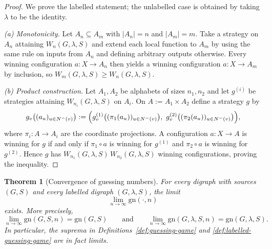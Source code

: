 \documentclass[11pt]{article}
\theoremstyle{plain}
\newtheorem{theorem}{Theorem}[section]
\theoremstyle{definition}
\theoremstyle{definition}
\theoremstyle{remark}
\newcommand{\A}{A}
\newcommand{\abs}[1]{\left\lvert #1 \right\rvert}
\newcommand{\gn}{\mathrm{gn}}
\begin{document}
\begin{proof}
We prove the labelled statement; the unlabelled case is obtained by taking $\lambda$ to be the identity.

\smallskip
\noindent\emph{(a) Monotonicity.}
Let $\A_n\subseteq \A_m$ with $\abs{\A_n}=n$ and $\abs{\A_m}=m$.
Take a strategy on $\A_n$ attaining $W_n(G,\lambda,S)$ and extend each local function to $\A_m$ by using the same rule
on inputs from $\A_n$ and defining arbitrary outputs otherwise.
Every winning configuration $a:X\to \A_n$ then yields a winning configuration $a:X\to \A_m$ by inclusion, so
$W_m(G,\lambda,S)\ge W_n(G,\lambda,S)$.

\smallskip
\noindent\emph{(b) Product construction.}
Let $\A_1,\A_2$ be alphabets of sizes $n_1,n_2$ and let $g^{(i)}$ be strategies attaining $W_{n_i}(G,\lambda,S)$ on $\A_i$.
On $\A:=\A_1\times \A_2$ define a strategy $g$ by
\[
  g_v\bigl((a_u)_{u\in N^-(v)}\bigr)
  :=
  \Bigl(
    g^{(1)}_v\bigl((\pi_1(a_u))_{u\in N^-(v)}\bigr),\ 
    g^{(2)}_v\bigl((\pi_2(a_u))_{u\in N^-(v)}\bigr)
  \Bigr),
\]
where $\pi_i:\A\to \A_i$ are the coordinate projections.
A configuration $a:X\to \A$ is winning for $g$ if and only if $\pi_1\circ a$ is winning for $g^{(1)}$ and $\pi_2\circ a$
is winning for $g^{(2)}$.
Hence $g$ has $W_{n_1}(G,\lambda,S)\,W_{n_2}(G,\lambda,S)$ winning configurations, proving the inequality.
\end{proof}

\begin{theorem}[Convergence of guessing numbers]
\label{thm:gn-converges}
For every digraph with sources $(G,S)$ and every labelled digraph $(G,\lambda,S)$, the limit
\[
  \lim_{n\to\infty}\gn(\cdot,n)
\]
exists.
More precisely,
\[
  \lim_{n\to\infty}\gn(G,S,n)=\gn(G,S)
  \qquad\text{and}\qquad
  \lim_{n\to\infty}\gn(G,\lambda,S,n)=\gn(G,\lambda,S).
\]
In particular, the suprema in Definitions~\ref{def:guessing-game} and \ref{def:labelled-guessing-game} are in fact
limits.
\end{theorem}
\end{document}
